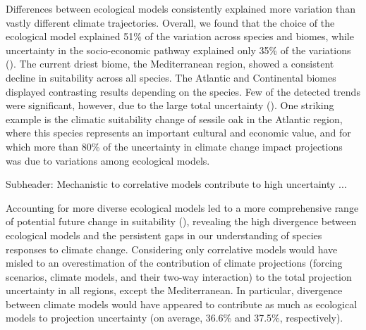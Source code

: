 \documentclass[11pt,letter]{article}
\begin{document}
Differences between ecological models consistently explained more variation than vastly different climate trajectories. Overall, we found that the choice of the ecological model explained 51\% of the variation across species and biomes, while uncertainty in the socio-economic pathway explained only 35\% of the variations (). The current driest biome, the Mediterranean region, showed a consistent decline in suitability across all species. The Atlantic and Continental biomes displayed contrasting results depending on the species. 
Few of the detected trends were significant, however, due to the large total uncertainty (). One striking example is the climatic suitability change of sessile oak in the Atlantic region, where this species represents an important cultural and economic value, and for which more than 80\% of the uncertainty in climate change impact projections was due to variations among ecological models. 


Subheader: Mechanistic to correlative models contribute to high uncertainty ... 

Accounting for more diverse ecological models led to a more comprehensive range of potential future change in suitability (), revealing the high divergence between ecological models and the persistent gaps in our understanding of species responses to climate change. Considering only correlative models would have misled to an overestimation of the contribution of climate projections (forcing scenarios, climate models, and their two-way interaction) to the total projection uncertainty in all regions, except the Mediterranean. In particular, divergence between climate models would have appeared to contribute as much as ecological models to projection uncertainty (on average, 36.6\% and 37.5\%, respectively). 
\end{document}
